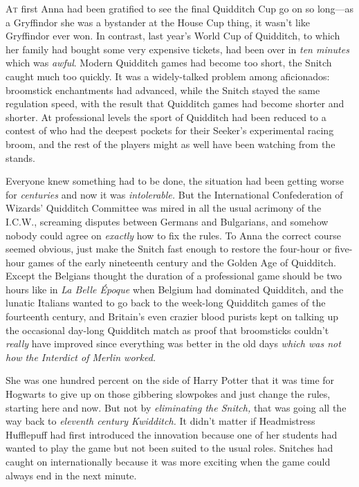 
\label{ch-AftermathSomethingtoProtect}

\lettrine{A}{t} first Anna had
been gratified to see the final Quidditch Cup go on so long---as a Gryffindor
she was a bystander at the House Cup thing, it wasn't like Gryffindor ever won.
In contrast, last year's World Cup of Quidditch, to which her family had bought
some very expensive tickets, had been over in \emph{ten minutes} which was
\emph{awful}. Modern Quidditch games had become too short, the Snitch caught
much too quickly. It was a widely-talked problem among aficionados: broomstick
enchantments had advanced, while the Snitch stayed the same regulation speed,
with the result that Quidditch games had become shorter and shorter. At
professional levels the sport of Quidditch had been reduced to a contest of who
had the deepest pockets for their Seeker's experimental racing broom, and the
rest of the players might as well have been watching from the stands.

Everyone knew something had to be done, the situation had been getting worse
for \emph{centuries} and now it was \emph{intolerable.} But the International
Confederation of Wizards' Quidditch Committee was mired in all the usual
acrimony of the I.C.W., screaming disputes between Germans and Bulgarians, and
somehow nobody could agree on \emph{exactly} how to fix the rules. To Anna the
correct course seemed obvious, just make the Snitch fast enough to restore the
four-hour or five-hour games of the early nineteenth century and the Golden Age
of Quidditch. Except the Belgians thought the duration of a professional game
should be two hours like in \emph{La Belle Époque} when Belgium had dominated
Quidditch, and the lunatic Italians wanted to go back to the week-long
Quidditch games of the fourteenth century, and Britain's even crazier blood
purists kept on talking up the occasional day-long Quidditch match as proof
that broomsticks couldn't \emph{really} have improved since everything was
better in the old days \emph{which was not how the Interdict of Merlin worked.}

She was one hundred percent on the side of Harry Potter that it was time for
Hogwarts to give up on those gibbering slowpokes and just change the rules,
starting here and now. But not by \emph{eliminating the Snitch,} that was going
all the way back to \emph{eleventh century Kwidditch.} It didn't matter if
Headmistress Hufflepuff had first introduced the innovation because one of her
students had wanted to play the game but not been suited to the usual roles.
Snitches had caught on internationally because it was more exciting when the
game could always end in the next minute.

